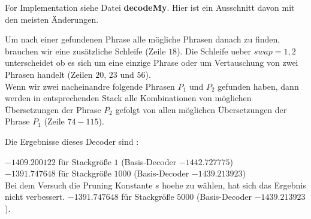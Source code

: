 \documentclass[11pt,a4paper]{scrartcl}
\begin{document}
\vspace{20pt}
For Implementation siehe Datei {\bf decodeMy}. Hier ist ein Ausschnitt davon mit den meisten Änderungen.

Um nach einer gefundenen Phrase alle mögliche Phrasen danach zu finden, brauchen wir eine zusätzliche Schleife (Zeile $18$).
Die Schleife ueber $swap=1,2$ unterscheidet ob es sich um eine einzige Phrase oder um Vertauschung von zwei Phrasen handelt (Zeilen $20$, $23$ und $56$).\\
Wenn wir zwei nacheinandre folgende Phrasen $P_1$ und $P_2$ gefunden haben, dann werden in entsprechenden Stack alle Kombinationen von  möglichen Übersetzungen der Phrase $P_2$ gefolgt von allen möglichen Übersetzungen der Phrase $P_1$ (Zeile $74-115$).

	 

\vspace{20pt}
Die Ergebnisse dieses Decoder sind :

\vspace{5pt}
$-1409.200122$ für Stackgröße $1$  (Basis-Decoder $-1442.727775$)\\
$-1391.747648$ für Stackgröße $1000$ (Basis-Decoder $-1439.213923$)\\

Bei dem Versuch die Pruning Konstante $s$ hoehe zu wählen, hat sich das Ergebnis nicht verbessert.
$-1391.747648$ für Stackgröße $5000$ (Basis-Decoder $-1439.213923$).
\end{document}
